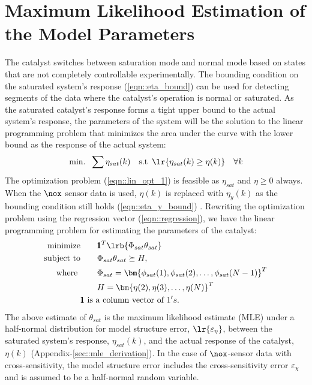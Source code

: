 \section{Maximum Likelihood Estimation of the Model Parameters}

The catalyst switches between saturation mode and normal mode based on states that are not completely controllable
experimentally. The bounding condition on the saturated system's response (\ref{eqn::eta_bound}) can be used for
detecting segments of the data where the catalyst's operation is normal or saturated. As the saturated catalyst's
response forms a tight upper bound to the actual system's response, the parameters of the system will be the solution
to the linear programming problem that minimizes the area under the curve with the lower bound as the response of the
actual system:
\begin{align}
\text{min. } \, \sum \eta_{sat}(k) \quad
\text{s.t } \, \lr{\eta_{sat}(k) \geq \eta(k)} \quad \forall  k \label{eqn::lin_opt_1}
\end{align}
The optimization problem (\ref{eqn::lin_opt_1}) is feasible as $\eta_{sat}$ and $\eta \geq 0$ always. When the $\nox$ sensor
data is used, $\eta(k)$ is replaced with $\eta_y(k)$ as the bounding condition still holds (\ref{eqn::eta_y_bound}) .
Rewriting the optimization problem using the regression vector (\ref{eqn::regression}), we have the linear programming
problem for estimating the parameters of the catalyst:
\begin{align}
        \text{minimize} &\qquad \pmb 1^T \lrb{\Phi_{sat} \theta_{sat}}      \label{eqn::lin_prog}\\
        \text{subject to} &\qquad \Phi_{sat} \theta_{sat} \succeq H,  \notag\\
        \text{where } & \qquad
        \Phi_{sat} = \bm{\phi_{sat}(1), \phi_{sat}(2), \hdots, \phi_{sat}(N-1)}^T \notag\\
        &\qquad H = \bm{ \eta(2), \eta(3), \hdots, \eta(N)}^T \notag\\
        & \text{$\pmb 1$ is a column vector of $1's$.} \notag
\end{align}
The above estimate of $\theta_{sat}$ is the maximum likelihood estimate (MLE) under a half-normal distribution
\citep{kay1993estimation, 942636} for model structure error, $\lr{\varepsilon_\eta}$, between the saturated system's
response, $\eta_{sat}(k)$, and the actual response of the catalyst, $\eta(k)$ (Appendix-\ref{sec::mle_derivation}). In
the case of $\nox$-sensor data with cross-sensitivity, the model structure error includes the cross-sensitivity error
$\varepsilon_{\chi}$ and is assumed to be a half-normal random variable.





